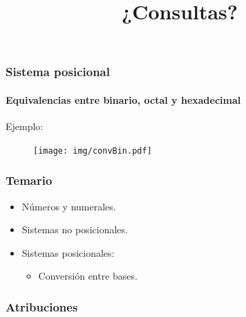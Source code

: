 \documentclass[11pt,a4paper,spanish]{beamer}
\begin{document}
\begin{frame}

\frametitle{Sistema posicional}
\framesubtitle{Equivalencias entre binario, octal y hexadecimal}

Ejemplo:

\begin{figure}
    \centering
    \texttt{[image: img/convBin.pdf]}
    \captionsetup{textfont=tiny,labelformat=empty}
    \caption{}
\end{figure}

\end{frame}

\begin{frame}

    \frametitle{Temario}

\begin{itemize}

    \item Números y numerales.

    \item Sistemas no posicionales.

    \item Sistemas posicionales:
    \begin{itemize}
        \item Conversión entre bases.
    \end{itemize}

\end{itemize}
\end{frame}

\begin{frame}

\title{¿Consultas?}
\maketitle

\end{frame}

\setcounter{lastPage}{\number\value{page}}

\begin{frame}%

\frametitle{Atribuciones}


\tiny

\end{frame}

\setcounter{page}{\number\value{lastPage}}
\end{document}
